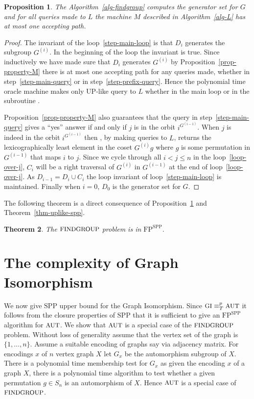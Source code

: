 \documentclass[11pt]{madras}%
\newtheorem{theorem}{Theorem}[chapter]
\newtheorem{proposition}[theorem]{Proposition}
\theoremstyle{remark}
\newcommand{\ProblemFont}[1]{{\ensuremath{\textrm{\small #1}}}}
\begin{document}
\begin{proposition}\label{prop-spp}
  The Algorithm~\ref{alg-findgroup} computes the generator set for $G$
  and for all queries made to $L$ the machine $M$ described in
  Algorithm~\ref{alg-L} has at most one accepting path.
\end{proposition}
\begin{proof}
  The invariant of the loop~\ref{step-main-loop} is that $D_i$
  generates the subgroup $G^{(i)}$. In the beginning of the loop the
  invariant is true.  Since inductively we have made sure that $D_i$
  generates $G^{(i)}$ by Proposition~\ref{prop-property-M} there is
  at most one accepting path for any queries made, whether in
  step~\ref{step-main-query} or in step~\ref{step-prefix-query}.
  Hence the polynomial time oracle machine makes only
  $\mathrm{UP}$-like query to $L$ whether in the main loop or in the
  subroutine \PrefixSearch{}.

  Proposition~\ref{prop-property-M} also guarantees that the query in
  step~\ref{step-main-query} gives a ``yes'' answer if and only if $j$
  is in the orbit $i^{G^{(i-1)}}$. When $j$ is indeed in the orbit
  $i^{G^{(i-1)}}$ then \PrefixSearch{}, by making queries to $L$,
  returns the lexicographically least element in the coset $G^{(i)}g$
  where $g$ is some permutation in $G^{(i-1)}$ that maps $i$ to $j$.
  Since we cycle through all $i < j \leq n$ in the
  loop~\ref{loop-over-j}, $C_{i}$ will be a right traversal of
  $G^{(i)}$ in $G^{(i-1)}$ at the end of loop~\ref{loop-over-j}.  As
  $D_{i-1} = D_i \cup C_i$ the loop invariant of
  loop~\ref{step-main-loop} is maintained.  Finally when $i = 0$,
  $D_0$ is the generator set for $G$.
\end{proof}

The following theorem is a direct consequence of
Proposition~\ref{prop-spp} and Theorem~\ref{thm-uplike-spp}.

\begin{theorem}\label{thm-findgroup}
  The $\ProblemFont{FINDGROUP}$ problem is in
  $\mathrm{FP}^\mathrm{SPP}$.
\end{theorem}

\section{The complexity of Graph Isomorphism}

We now give $\mathrm{SPP}$ upper bound for the Graph Isomorphism.
Since $\ProblemFont{GI} \equiv_T^p \ProblemFont{AUT}$ it follows from
the closure properties of $\mathrm{SPP}$ that it is sufficient to give
an $\mathrm{FP}^{\mathrm{SPP}}$ algorithm for $\ProblemFont{AUT}$. We
show that $\ProblemFont{AUT}$ is a special case of the
$\ProblemFont{FINDGROUP}$ problem. Without loss of generality assume
that the vertex set of the graph is $\{1,\ldots,n\}$. Assume a
suitable encoding of graphs say via adjacency matrix.  For encodings
$x$ of $n$ vertex graph $X$ let $G_x$ be the automorphism subgroup of
$X$. There is a polynomial time membership test for $G_x$ as given the
encoding $x$ of a graph $X$, there is a polynomial time algorithm to
test whether a given permutation $g \in S_n$ is an automorphism of
$X$. Hence $\ProblemFont{AUT}$ is a special case of
$\ProblemFont{FINDGROUP}$.
\end{document}
